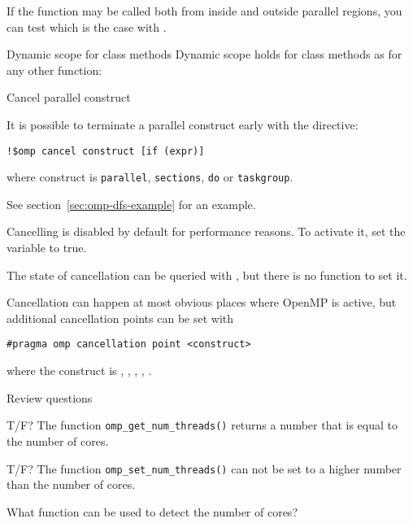 If the function may be called both from inside and outside parallel
regions, you can test which is the case with .

\begin{cppnote}{Dynamic scope for class methods}
  Dynamic scope holds for class methods as for any other function:
  \def\snippetcodefraction{.55}
  \def\snippetlistfraction{.45}
\end{cppnote}


 {Cancel parallel construct}
\label{sec:omp-cancel}

It is possible to terminate a parallel construct early
with the  directive:
\begin{lstlisting}
!$omp cancel construct [if (expr)]
\end{lstlisting}
where construct is
\lstinline{parallel},
\lstinline{sections},
\lstinline{do}
or
\lstinline{taskgroup}.

See section~\ref{sec:omp-dfs-example} for an example.

Cancelling is disabled by default for performance reasons.
To activate it, set the  variable to true.

The state of cancellation can be queried with ,
but there is no function to set it.

Cancellation can happen at most obvious places where OpenMP is active,
but additional cancellation points can be set with 
\begin{lstlisting}
#pragma omp cancellation point <construct>
\end{lstlisting}
where the construct is , ,
, , .

 {Review questions}

\begin{exercise}
  T/F?
  The function \lstinline+omp_get_num_threads()+
  returns a number that is equal to the number of cores.
\end{exercise}

\begin{exercise}
  T/F?
  The function \lstinline+omp_set_num_threads()+
  can not be set to a higher number than the number of cores.
\end{exercise}

\begin{exercise}
  What function can be used to detect the number of cores? 
\end{exercise}
